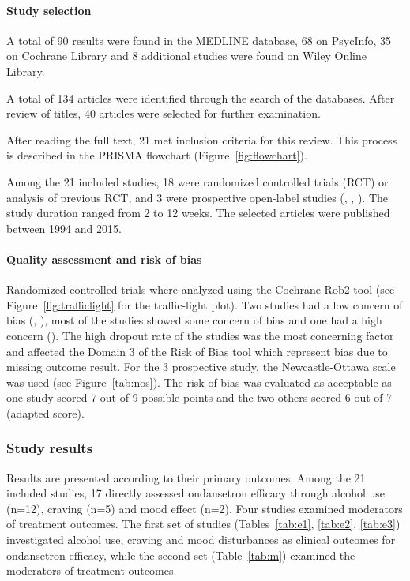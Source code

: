 
%

\paragraph{Study selection}
A total of 90 results were found in the MEDLINE database, 68 on PsycInfo, 35 on Cochrane Library and 8 additional studies were found on Wiley Online Library.  

A total of 134 articles were identified through the search of the databases. After review of titles, 40 articles were selected for further examination.

After reading the full text, 21 met inclusion criteria for this review. This process is described in the PRISMA flowchart (Figure~\ref{fig:flowchart}). 

Among the 21 included studies, 18 were randomized controlled trials (RCT) or analysis of previous RCT, and 3 were prospective open-label studies (\cite{kranzler_effects_2003}, \cite{dawes_prospective_2005}, \cite{dawes_reductions_2005}). The study duration ranged from 2 to 12 weeks. The selected articles were published between 1994 and 2015. 

\paragraph{Quality assessment and risk of bias}
Randomized controlled trials where analyzed using the Cochrane Rob2 tool (see Figure~\ref{fig:trafficlight} for the traffic-light plot). Two studies had a low concern of bias (\cite{sellers_clinical_1994}, \cite{myrick_effect_2008}), most of the studies showed some concern of bias and one had a high concern (\cite{correa_filho_pilot_2013}).
The high dropout rate of the studies was the most concerning factor and affected the Domain 3 of the Risk of Bias tool which represent bias due to missing outcome result.
For the 3 prospective study, the Newcastle-Ottawa scale was used (see Figure~\ref{tab:nos}). The risk of bias was evaluated as acceptable as one study scored 7 out of 9 possible points and the two others scored 6 out of 7 (adapted score).

\subsubsection*{Study results}
Results are presented according to their primary outcomes. Among the 21 included studies, 17 directly assessed ondansetron efficacy through alcohol use (n=12), craving (n=5) and mood effect (n=2). Four studies examined moderators of treatment outcomes.
The first set of studies (Tables~\ref{tab:e1}, \ref{tab:e2}, \ref{tab:e3}) investigated alcohol use, craving and mood disturbances as clinical outcomes for ondansetron efficacy, while the second set (Table~\ref{tab:m}) examined the moderators of treatment outcomes. 
